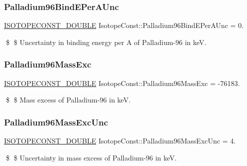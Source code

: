 \subsubsection{\texorpdfstring{Palladium96\+Bind\+E\+Per\+A\+Unc}{Palladium96BindEPerAUnc}}
{\footnotesize\ttfamily \mbox{\hyperlink{group___isotope_const-_macros_ga8f45a7272ce02c0b4c65c44636ed719a}{I\+S\+O\+T\+O\+P\+E\+C\+O\+N\+S\+T\+\_\+\+D\+O\+U\+B\+LE}} Isotope\+Const\+::\+Palladium96\+Bind\+E\+Per\+A\+Unc = 0.}

\$ \$ Uncertainty in binding energy per A of Palladium-\/96 in keV. \mbox{\label{group___isotope_const-_palladium-_pd96_ga61d28a2cd2dbba0916d50683b77970b7}} 
\subsubsection{\texorpdfstring{Palladium96\+Mass\+Exc}{Palladium96MassExc}}
{\footnotesize\ttfamily \mbox{\hyperlink{group___isotope_const-_macros_ga8f45a7272ce02c0b4c65c44636ed719a}{I\+S\+O\+T\+O\+P\+E\+C\+O\+N\+S\+T\+\_\+\+D\+O\+U\+B\+LE}} Isotope\+Const\+::\+Palladium96\+Mass\+Exc = -\/76183.}

\$ \$ Mass excess of Palladium-\/96 in keV. \mbox{\label{group___isotope_const-_palladium-_pd96_gad097b15c419b860dab4cd40206b0c7cb}} 
\subsubsection{\texorpdfstring{Palladium96\+Mass\+Exc\+Unc}{Palladium96MassExcUnc}}
{\footnotesize\ttfamily \mbox{\hyperlink{group___isotope_const-_macros_ga8f45a7272ce02c0b4c65c44636ed719a}{I\+S\+O\+T\+O\+P\+E\+C\+O\+N\+S\+T\+\_\+\+D\+O\+U\+B\+LE}} Isotope\+Const\+::\+Palladium96\+Mass\+Exc\+Unc = 4.}

\$ \$ Uncertainty in mass excess of Palladium-\/96 in keV. \mbox{\label{group___isotope_const-_palladium-_pd96_ga7de80e5b055ac22ed05e584f1545c01c}} 
